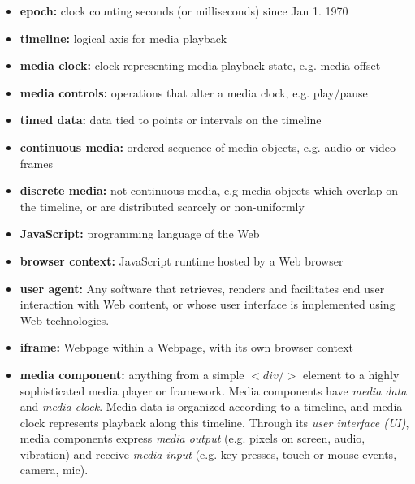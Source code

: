 \begin{itemize}
\item{\textbf{epoch:} clock counting seconds (or milliseconds) since Jan 1. 1970}
\item{\textbf{timeline:} logical axis for media playback}
\item{\textbf{media clock:} clock representing media playback state, e.g. media offset}
\item{\textbf{media controls:} operations that alter a media clock, e.g. play/pause}
\item{\textbf{timed data:} data tied to points or intervals on the timeline}
\item{\textbf{continuous media:} ordered sequence of media objects, e.g. audio or video frames}
\item{\textbf{discrete media:} not continuous media, e.g media objects which overlap on the timeline, or are distributed scarcely or non-uniformly}
\item{\textbf{JavaScript:} programming language of the Web}
\item{\textbf{browser context:} JavaScript runtime hosted by a Web browser}
\item{\textbf{user agent:} Any software that retrieves, renders and facilitates end user interaction with Web content, or whose user interface is implemented using Web technologies.}
\item{\textbf{iframe:} Webpage within a Webpage, with its own browser context}
\item{\textbf{media component:} anything from a simple $<div/>$ element to a highly sophisticated media player or framework. Media components have \emph{media data} and \emph{media clock}. Media data
is organized according to a timeline, and media clock represents playback along
this timeline. Through its \emph{user interface (UI)}, media components
express \emph{media output} (e.g. pixels on screen, audio, vibration) and
receive \emph{media input} (e.g. key-presses, touch or mouse-events, camera, mic).}
\end{itemize}